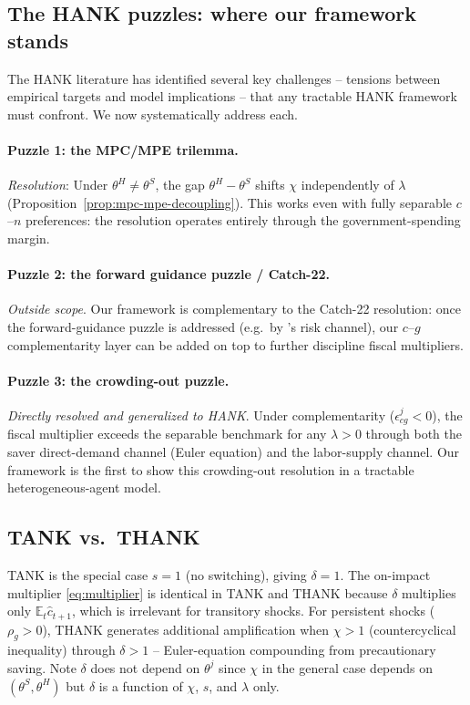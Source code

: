 \subsection{The HANK puzzles: where our framework stands}\label{subsec:puzzles}

The HANK literature has identified several key challenges -- tensions between
empirical targets and model implications -- that any tractable HANK framework
must confront. We now systematically address each.

\paragraph{Puzzle 1: the MPC/MPE trilemma.}
\emph{Resolution}: Under $\theta^{H}\neq\theta^{S}$, the gap
$\theta^{H}-\theta^{S}$ shifts $\chi$ independently of $\lambda$
(Proposition~\ref{prop:mpc-mpe-decoupling}). This works even with fully
separable $c$--$n$ preferences: the resolution operates entirely through the
government-spending margin.

\paragraph{Puzzle 2: the forward guidance puzzle / Catch-22.}
\emph{Outside scope}. Our framework is complementary to the Catch-22 resolution:
once the forward-guidance puzzle is addressed (e.g.\ by \bilbiie{}'s risk
channel), our $c$--$g$ complementarity layer can be added on top to further
discipline fiscal multipliers.

\paragraph{Puzzle 3: the crowding-out puzzle.}
\emph{Directly resolved and generalized to HANK}. Under complementarity
($\epsilon^{j}_{cg}<0$), the fiscal multiplier exceeds the separable benchmark
for any $\lambda>0$ through both the saver direct-demand channel (Euler
equation) and the \HtM{} labor-supply channel. Our framework is the first to
show this crowding-out resolution in a tractable heterogeneous-agent model.

\subsection{TANK vs.\ THANK}\label{subsec:tank-thank}
TANK is the special case $s=1$ (no switching), giving $\delta=1$. The on-impact
multiplier \eqref{eq:multiplier} is identical in TANK and THANK because
$\delta$ multiplies only $\mathbb{E}_{t}\hat c_{t+1}$, which is irrelevant for
transitory shocks. For persistent shocks ($\rho_{g}>0$), THANK generates
additional amplification when $\chi>1$ (countercyclical inequality) through
$\delta>1$ -- Euler-equation compounding from precautionary saving. Note
$\delta$ does not depend on $\theta^{j}$ since $\chi$ in the general case
depends on $(\theta^{S},\theta^{H})$ but $\delta$ is a function of $\chi$, $s$,
and $\lambda$ only.
